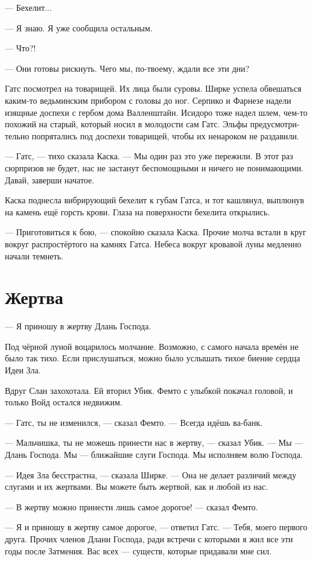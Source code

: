 \documentclass[a4paper,12pt,fleqn]{book}\usepackage{polyglossia}\setdefaultlanguage[babelshorthands=true]{russian}\setotherlanguage{english}\defaultfontfeatures{Ligatures=TeX,Mapping=tex-text}\usepackage{xcolor}\newcommand{\ml}[3]{#2}
\begin{document}
--- Бехелит...

--- Я знаю.
Я уже сообщила остальным.

--- Что?!

--- Они готовы рискнуть.
Чего мы, по-твоему, ждали все эти дни?

Гатс посмотрел на товарищей.
Их лица были суровы.
Ширке успела обвешаться каким-то ведьминским прибором с головы до ног.
Серпико и Фарнезе надели изящные доспехи с гербом дома Валленштайн.
Исидоро тоже надел шлем, чем-то похожий на старый, который носил в молодости сам Гатс.
Эльфы предусмотрительно попрятались под доспехи товарищей, чтобы их ненароком не раздавили.

--- Гатс, --- тихо сказала Каска.
--- Мы один раз это уже пережили.
В этот раз сюрпризов не будет, нас не застанут беспомощными и ничего не понимающими.
Давай, заверши начатое.

Каска поднесла вибрирующий бехелит к губам Гатса, и тот кашлянул, выплюнув на камень ещё горсть крови.
Глаза на поверхности бехелита открылись.

--- Приготовиться к бою, --- спокойно сказала Каска.
Прочие молча встали в круг вокруг распростёртого на камнях Гатса.
Небеса вокруг кровавой луны медленно начали темнеть.

\section{Жертва}

--- Я приношу в жертву Длань Господа.

Под чёрной луной воцарилось молчание.
Возможно, с самого начала времён не было так тихо.
Если прислушаться, можно было услышать тихое биение сердца Идеи Зла.

Вдруг Слан захохотала.
Ей вторил Убик.
Фемто с улыбкой покачал головой, и только Войд остался недвижим.

--- Гатс, ты не изменился, --- сказал Фемто.
--- Всегда идёшь ва-банк.

--- Мальчишка, ты не можешь принести нас в жертву, --- сказал Убик.
--- Мы --- Длань Господа.
Мы --- ближайшие слуги Господа.
Мы исполняем волю Господа.

--- Идея Зла бесстрастна, --- сказала Ширке.
--- Она не делает различий между слугами и их жертвами.
Вы можете быть жертвой, как и любой из нас.

--- В жертву можно принести лишь самое дорогое! --- сказал Фемто.

--- Я и приношу в жертву самое дорогое, --- ответил Гатс.
--- Тебя, моего первого друга.
Прочих членов Длани Господа, ради встречи с которыми я жил все эти годы после Затмения.
Вас всех --- существ, которые придавали мне сил.
\end{document}
